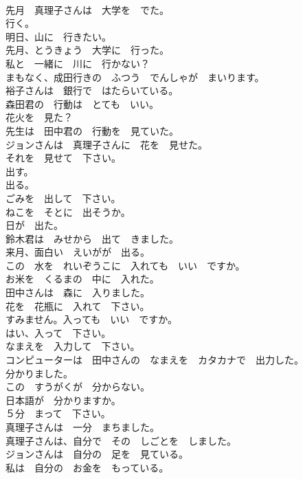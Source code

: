 \documentclass[8pt]{extreport}
\begin{document}
\begin{CJK}{UTF8}{min}
\\	先月　真理子さんは　大学を　でた。	
\\	行く。	
\\	明日、山に　行きたい。	
\\	先月、とうきょう　大学に　行った。	
\\	私と　一緒に　川に　行かない？	
\\	まもなく、成田行きの　ふつう　でんしゃが　まいります。	
\\	裕子さんは　銀行で　はたらいている。	
\\	森田君の　行動は　とても　いい。	
\\	花火を　見た？	
\\	先生は　田中君の　行動を　見ていた。	
\\	ジョンさんは　真理子さんに　花を　見せた。	
\\	それを　見せて　下さい。	
\\	出す。	
\\	出る。	
\\	ごみを　出して　下さい。	
\\	ねこを　そとに　出そうか。	
\\	日が　出た。	
\\	鈴木君は　みせから　出て　きました。	
\\	来月、面白い　えいがが　出る。	
\\	この　水を　れいぞうこに　入れても　いい　ですか。	
\\	お米を　くるまの　中に　入れた。	
\\	田中さんは　森に　入りました。	
\\	花を　花瓶に　入れて　下さい。	
\\	すみません。入っても　いい　ですか。	
\\	はい、入って　下さい。	
\\	なまえを　入力して　下さい。	
\\	コンピューターは　田中さんの　なまえを　カタカナで　出力した。	
\\	分かりました。	
\\	この　すうがくが　分からない。	
\\	日本語が　分かりますか。	
\\	５分　まって　下さい。	
\\	真理子さんは　一分　まちました。	
\\	真理子さんは、自分で　その　しごとを　しました。	
\\	ジョンさんは　自分の　足を　見ている。	
\\	私は　自分の　お金を　もっている。	

\end{CJK}
\end{document}
